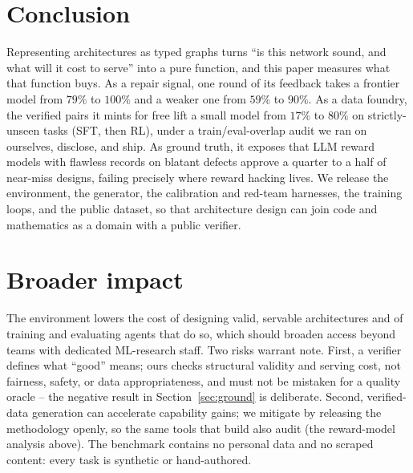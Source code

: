 \documentclass[11pt]{article}
\begin{document}
\section{Conclusion}
Representing architectures as typed graphs turns ``is this network sound, and what will it cost to serve'' into a pure function, and this paper measures what that function buys. As a repair signal, one round of its feedback takes a frontier model from $79\%$ to $100\%$ and a weaker one from $59\%$ to $90\%$. As a data foundry, the verified pairs it mints for free lift a small model from $17\%$ to $80\%$ on strictly-unseen tasks (SFT, then RL), under a train/eval-overlap audit we ran on ourselves, disclose, and ship. As ground truth, it exposes that LLM reward models with flawless records on blatant defects approve a quarter to a half of near-miss designs, failing precisely where reward hacking lives. We release the environment, the generator, the calibration and red-team harnesses, the training loops, and the public dataset, so that architecture design can join code and mathematics as a domain with a public verifier.

\section*{Broader impact}
The environment lowers the cost of designing valid, servable architectures and of training and evaluating agents that do so, which should broaden access beyond teams with dedicated ML-research staff. Two risks warrant note. First, a verifier defines what ``good'' means; ours checks structural validity and serving cost, not fairness, safety, or data appropriateness, and must not be mistaken for a quality oracle -- the negative result in Section~\ref{sec:ground} is deliberate. Second, verified-data generation can accelerate capability gains; we mitigate by releasing the methodology openly, so the same tools that build also audit (the reward-model analysis above). The benchmark contains no personal data and no scraped content: every task is synthetic or hand-authored.
\end{document}

